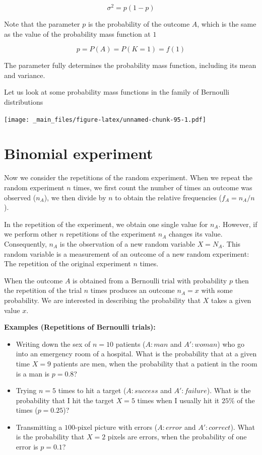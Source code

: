 \documentclass[
]{book}
\begin{document}
\[\sigma^2=p(1-p)\]

Note that the parameter \(p\) is the probability of the outcome \(A\),
which is the same as the value of the probability mass function at \(1\)

\[p=P(A)=P(K=1)=f(1)\]

The parameter fully determines the probability mass function, including its mean and variance.

Let us look at some probability mass functions in the family of Bernoulli distributions

\texttt{[image: \_main\_files/figure-latex/unnamed-chunk-95-1.pdf]}

\hypertarget{binomial-experiment}{%
\section{Binomial experiment}\label{binomial-experiment}}

Now we consider the repetitions of the random experiment. When we repeat the random experiment \(n\) times, we first count the number of times an outcome was observed (\(n_A\)), we then divide by \(n\) to obtain the relative frequencies (\(f_A=n_A/n\)).

In the repetition of the experiment, we obtain one single value for \(n_A\). However, if we perform other \(n\) repetitions of the experiment \(n_A\) changes its value. Consequently, \(n_A\) is the observation of a new random variable \(X=N_A\). This random variable is a measurement of an outcome of a new random experiment: The repetition of the original experiment \(n\) times.

When the outcome \(A\) is obtained from a Bernoulli trial with probability \(p\) then the repetition of the trial \(n\) times produces an outcome \(n_A=x\) with some probability. We are interested in describing the probability that \(X\) takes a given value \(x\).

\textbf{Examples (Repetitions of Bernoulli trials):}

\begin{itemize}
\item
  Writing down the sex of \(n=10\) patients (\(A:man\) and \(A':woman\)) who go into an emergency room of a hospital. What is the probability that at a given time \(X=9\) patients are men, when the probability that a patient in the room is a man is \(p=0.8\)?
\item
  Trying \(n=5\) times to hit a target (\(A:success\) and \(A':failure\)). What is the probability that I hit the target \(X=5\) times when I usually hit it \(25\%\) of the times (\(p=0.25\))?
\item
  Transmitting a \(100\)-pixel picture with errors (\(A:error\) and \(A':correct\)). What is the probability that \(X=2\) pixels are errors, when the probability of one error is \(p=0.1\)?
\end{itemize}
\end{document}
